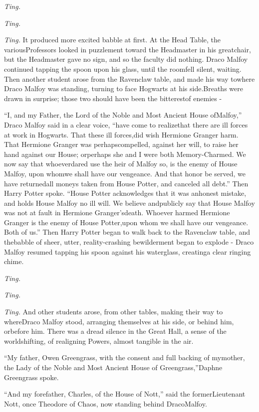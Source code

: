 \emph{Ting.}

\emph{Ting.}

\emph{Ting.}
It produced more excited babble at first. At the Head Table, the variousProfessors looked in puzzlement toward the Headmaster in his greatchair, but the Headmaster gave no sign, and so the faculty did nothing.
Draco Malfoy continued tapping the spoon upon his glass, until the roomfell silent, waiting.
Then another student arose from the Ravenclaw table, and made his way towhere Draco Malfoy was standing, turning to face Hogwarts at his side.Breaths were drawn in surprise; those two should have been the bitterestof enemies -

``I, and my Father, the Lord of the Noble and Most Ancient House ofMalfoy,'' Draco Malfoy said in a clear voice, ``have come to realizethat there are ill forces at work in Hogwarts. That these ill forces,did wish Hermione Granger harm. That Hermione Granger was perhapscompelled, against her will, to raise her hand against our House; orperhaps she and I were both Memory-Charmed. We now say that whoeverdared use the heir of Malfoy so, is the enemy of House Malfoy, upon whomwe shall have our vengeance. And that honor be served, we have returnedall moneys taken from House Potter, and canceled all debt.''
Then Harry Potter spoke. ``House Potter acknowledges that it was anhonest mistake, and holds House Malfoy no ill will. We believe andpublicly say that House Malfoy was not at fault in Hermione Granger'sdeath. Whoever harmed Hermione Granger is the enemy of House Potter,upon whom we shall have our vengeance. Both of us.''
Then Harry Potter began to walk back to the Ravenclaw table, and thebabble of sheer, utter, reality-crashing bewilderment began to explode -
Draco Malfoy resumed tapping his spoon against his waterglass, creatinga clear ringing chime.

\emph{Ting.}

\emph{Ting.}

\emph{Ting.}
And other students arose, from other tables, making their way to whereDraco Malfoy stood, arranging themselves at his side, or behind him, orbefore him.
There was a dread silence in the Great Hall, a sense of the worldshifting, of realigning Powers, almost tangible in the air.

``My father, Owen Greengrass, with the consent and full backing of mymother, the Lady of the Noble and Most Ancient House of Greengrass,''Daphne Greengrass spoke.

``And my forefather, Charles, of the House of Nott,'' said the formerLieutenant Nott, once Theodore of Chaos, now standing behind DracoMalfoy.

